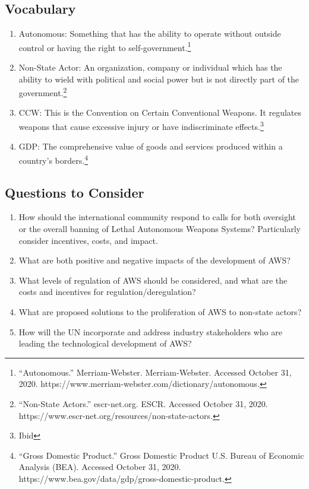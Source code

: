 \documentclass[10pt, letterpaper]{article}
\begin{document}
\subsection{Vocabulary}

\begin{enumerate}
\def\labelenumi{\arabic{enumi}.}
\item
  Autonomous: Something that has the ability to operate without outside
  control or having the right to self-government.\footnote{``Autonomous.''
    Merriam-Webster. Merriam-Webster. Accessed October 31, 2020.
    https://www.merriam-webster.com/dictionary/autonomous.}
\item
  Non-State Actor: An organization, company or individual which has the
  ability to wield with political and social power but is not directly
  part of the government.\footnote{``Non-State Actors.'' escr-net.org.
    ESCR. Accessed October 31, 2020.
    https://www.escr-net.org/resources/non-state-actors.}
\item
  CCW: This is the Convention on Certain Conventional Weapons. It
  regulates weapons that cause excessive injury or have indiscriminate
  effects.\footnote{Ibid}
\item
  GDP: The comprehensive value of goods and services produced within a
  country's borders.\footnote{``Gross Domestic Product.'' Gross Domestic
    Product \textbar{} U.S. Bureau of Economic Analysis (BEA). Accessed
    October 31, 2020.
    https://www.bea.gov/data/gdp/gross-domestic-product.}
\end{enumerate}

\subsection{Questions to Consider}

\begin{enumerate}
\def\labelenumi{\arabic{enumi}.}
\item
  How should the international community respond to calls for both
  oversight or the overall banning of Lethal Autonomous Weapons Systems?
  Particularly consider incentives, costs, and impact.
\item
  What are both positive and negative impacts of the development of AWS?
\item
  What levels of regulation of AWS should be considered, and what are
  the costs and incentives for regulation/deregulation?
\item
  What are proposed solutions to the proliferation of AWS to non-state
  actors?
\item
  How will the UN incorporate and address industry stakeholders who are
  leading the technological development of AWS?
\end{enumerate}
\end{document}

